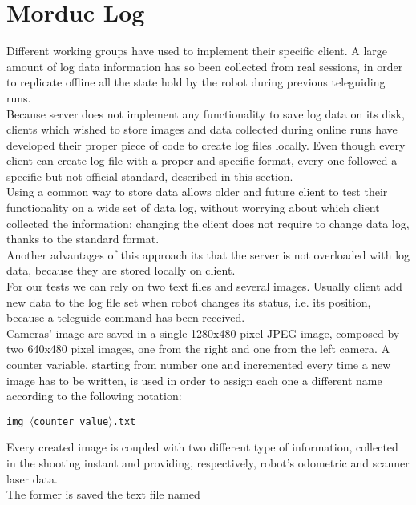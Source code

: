 \section{Morduc Log}
\label{log:morduc}

Different working groups have used \morduc{} to implement their
specific client. A large amount of log data
information has so been collected from real sessions, in
order to replicate offline all the state hold by the robot
during previous teleguiding runs.
\\
Because \morduc{} server does not implement any functionality
to save log data on its disk, clients which wished to store
images and data collected during online runs have developed their
proper piece of code to create log files locally.
Even though every client can create log file with a proper and
specific format, every one followed a specific but not official
standard, described in this section.
\\
Using a common way to store data allows older and future client to
test their functionality on a wide set of data log, without
worrying about which client collected the information:
changing the client does not require to change data log,
thanks to the standard format.
\\
Another advantages of this approach 
its that the server is not overloaded
with log data, because they are stored locally on client.
\\
For our tests we can rely on two text files and several images.
Usually client add new data to the log file set 
when robot changes its status,
i.e. its position, because a teleguide command has
been received.
\\
Cameras' image are saved in 
a single 1280x480 pixel JPEG image, composed by two
640x480 pixel images, one from the right and one from the left camera.
A counter variable,
starting from number one and incremented every time a new image
has to be written, is used in order to assign each one a different
name according to the following notation:

\begin{center}
  \texttt{img\_$\langle$counter\_value$\rangle$.txt}
\end{center}

Every created image is coupled with two different type of
information, collected in the shooting instant and providing,
respectively, robot's odometric and scanner laser data.
\\
The former is saved the text file named

